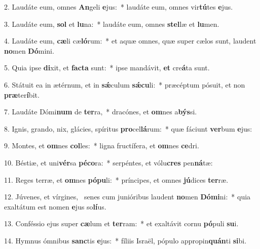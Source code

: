 2. Laudáte eum, omnes \textbf{An}geli \textbf{e}jus:~*  laudáte eum, omnes vir\textbf{tú}tes \textbf{e}jus.\

3. Laudáte eum, \textbf{sol} et \textbf{lu}na:~*  laudáte eum, omnes \textbf{stel}læ et \textbf{lu}men.\

4. Laudáte eum, \textbf{cæ}li cæ\textbf{ló}rum:~*  et aquæ omnes, quæ super cælos sunt, laudent \textbf{no}men \textbf{Dó}mini.\

5. Quia ipse \textbf{di}xit, et \textbf{fac}\textbf{ta} sunt:~*  ipse mandávit, \textbf{et} cre\textbf{á}ta sunt.\

6. Státuit ea in ætérnum, et in \textbf{sǽ}culum \textbf{sǽ}\textbf{cu}li:~*  præcéptum pósuit, et non \textbf{præ}ter\textbf{í}bit.\

7. Laudáte Dómi\textbf{num} de \textbf{ter}ra,~*  dracónes, et \textbf{om}nes a\textbf{býs}si.\

8. Ignis, grando, nix, glácies, spíritus \textbf{pro}cel\textbf{lá}rum:~*  quæ fáciunt \textbf{ver}bum \textbf{e}jus:\

9. Montes, et \textbf{om}nes \textbf{col}les:~*  ligna fructífera, et \textbf{om}nes \textbf{ce}dri.\

10. Béstiæ, et uni\textbf{vér}sa \textbf{pé}\textbf{co}ra:~*  serpéntes, et vólu\textbf{cres} pen\textbf{ná}tæ:\

11. Reges terræ, et \textbf{om}nes \textbf{pó}\textbf{pu}li:~*  príncipes, et omnes \textbf{jú}dices \textbf{ter}ræ.\

12. Júvenes, et vírgines, \dag\  senes cum junióribus laudent \textbf{no}men \textbf{Dó}\textbf{mi}ni:~*  quia exaltátum est nomen \textbf{e}jus so\textbf{lí}us.\

13. Conféssio ejus super \textbf{cæ}lum et \textbf{ter}ram:~*  et exaltávit cornu \textbf{pó}puli \textbf{su}i.\

14. Hymnus ómnibus \textbf{sanc}tis \textbf{e}jus:~*  fíliis Israël, pópulo appropin\textbf{quán}ti \textbf{si}bi.\

